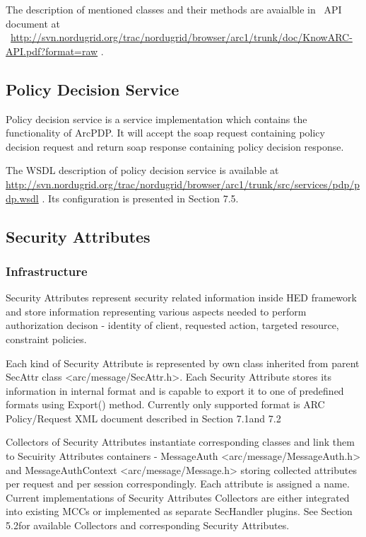 \documentclass{article}
\begin{document}
{\upshape\color{black}
The description of mentioned classes and their methods are avaialble in
\ API document at
\ \url{http://svn.nordugrid.org/trac/nordugrid/browser/arc1/trunk/doc/KnowARC-API.pdf?format=raw}
.}

\subsection{Policy Decision Service}
{\upshape\color{black}
Policy decision service is a service implementation which contains the
functionality of ArcPDP. It will accept the soap request containing
policy decision request and return soap response containing policy
decision response.}

{\upshape\color{black}
The WSDL description of policy decision service is available at
\url{http://svn.nordugrid.org/trac/nordugrid/browser/arc1/trunk/src/services/pdp/pdp.wsdl}
. It{\textquotesingle}s configuration is presented in Section 7.5. }

\subsection{Security Attributes}
\subsubsection[Infrastructure]{Infrastructure}
\label{bkm:Ref204009818}{\upshape\color{black}
Security Attributes represent security related information inside HED
framework and store information representing various aspects needed to
perform authorization decison - identity of client, requested action,
targeted resource, constraint policies. }

{\upshape\color{black}
Each kind of Security Attribute is represented by own class inherited
from parent SecAttr class
{\textless}arc/message/SecAttr.h{\textgreater}. Each Security Attribute
stores it{\textquotesingle}s information in internal format and is
capable to export it to one of predefined formats using Export()
method. Currently only supported format is ARC Policy/Request XML
document described in Section 7.1and 7.2}

{\upshape\color{black}
Collectors of Security Attributes instantiate corresponding classes and
link them to Secuirity Attributes containers - MessageAuth
{\textless}arc/message/MessageAuth.h{\textgreater} and
MessageAuthContext {\textless}arc/message/Message.h{\textgreater}
storing collected attributes per request and per session
correspondingly. Each attribute is assigned a name. Current
implementations of Security Attributes Collectors are either integrated
into existing MCCs or implemented as separate SecHandler plugins. See
Section 5.2for available Collectors and corresponding Security
Attributes. }
\end{document}
